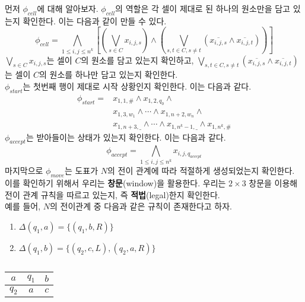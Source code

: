 \documentclass[b5paper]{book}
\theoremstyle{definition}
\newenvironment{pf*}{\pushQED{\qed}\pf}{\popQED\endpf}
\begin{document}
\begin{pf*}
    먼저 $\phi_{cell}$에 대해 알아보자. $\phi_{cell}$의 역할은 각 셀이 제대로 된 하나의 원소만을 담고 있는지 확인한다.
    이는 다음과 같이 만들 수 있다.
    $$\phi_{cell} = \bigwedge_{1 \le i,j \le n^k} \left[\left(\bigvee_{s\in C} x_{i,j,s}\right)
    \wedge \left(\bigvee_{s,t \in C, s \neq t} \left(\overline{x_{i,j,s}} \wedge 
    \overline{x_{i,j,t}}\right) \right)\right]$$
    $\bigvee_{s\in C} x_{i,j,s}$는 셀이 $C$의 원소를 담고 있는지 확인하고, $\bigvee_{s,t \in C, s \neq t} 
    \left(\overline{x_{i,j,s}} \wedge 
    \overline{x_{i,j,t}}\right)$는 셀이 $C$의 원소를 하나만 담고 있는지 확인한다. \\ 
    $\phi_{start}$는 첫번째 행이 제대로 시작 상황인지 확인한다. 이는 다음과 같다.
    \begin{align*}
        \phi_{start} = &x_{1,1,\#} \wedge x_{1,2,q_0} \wedge \\ 
        &x_{1,3,w_1} \wedge \cdots \wedge x_{1,n+2, w_n} \wedge \\ 
        &x_{1,n+3,\_} \wedge \cdots \wedge x_{1,n^k - 1 , \_} \wedge x_{1, n^k , \#}
    \end{align*} 
    $\phi_{accept}$는 받아들이는 상태가 있는지 확인한다. 이는 다음과 같다.
    $$\phi_{accept} = \bigwedge_{1 \le i,j \le n^k} x_{i,j,q_{accept}}$$
    마지막으로 $\phi_{move}$는 도표가 $N$의 전이 관계에 따라 적절하게 생성되었는지 확인한다. 이를 확인하기 
    위해서 우리는 \textbf{창문}(window)을 활용한다. 우리는 $2 \times 3$ 창문을 이용해 전이 관계 규칙을
    따르고 있는지, 즉 \textbf{적법}(legal)한지 확인한다.\\
    예를 들어, $N$의 전이관계 중 다음과 같은 규칙이 존재한다고 하자. 
    \begin{enumerate}
        \item $\Delta(q_1, a) = \{(q_1, b, R)\}$
        \item $\Delta(q_1, b) = \{(q_2,c,L),(q_2,a,R)\}$
    \end{enumerate}
    \begin{table}[!ht]
        \begin{subtable}[h]{0.3\textwidth}
            \centering
            \begin{tabular}{ | c | c | c|}
            \hline 
            $a$ & $q_1$ & $b$ \\ 
            \hline 
            $q_2$ & $a$ & $c$ \\ 
            \hline
           \end{tabular}
           \caption{}
        \end{subtable}
        \hfill

\end{table}
\end{pf*}
\end{document}
